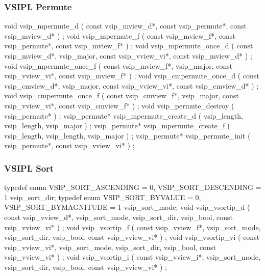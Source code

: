 \subsubsection*{VSIPL Permute}
void vsip_mpermute_d ( const vsip_mview_d*, const vsip_permute*, const vsip_mview_d* ) ;
void vsip_mpermute_f ( const vsip_mview_f*, const vsip_permute*, const vsip_mview_f* ) ;
void vsip_mpermute_once_d ( const vsip_mview_d*, vsip_major, const vsip_vview_vi*, const vsip_mview_d* ) ;
void vsip_mpermute_once_f ( const vsip_mview_f*, vsip_major, const vsip_vview_vi*, const vsip_mview_f* ) ;
void vsip_cmpermute_once_d ( const vsip_cmview_d*, vsip_major, const vsip_vview_vi*, const vsip_cmview_d* ) ;
void vsip_cmpermute_once_f ( const vsip_cmview_f*, vsip_major, const vsip_vview_vi*, const vsip_cmview_f* ) ;
void vsip_permute_destroy ( vsip_permute* ) ;
vsip_permute* vsip_mpermute_create_d ( vsip_length, vsip_length, vsip_major ) ;
vsip_permute* vsip_mpermute_create_f ( vsip_length, vsip_length, vsip_major ) ;
vsip_permute* vsip_permute_init ( vsip_permute*, const vsip_vview_vi* ) ;

\subsubsection*{VSIPL Sort}
typedef enum { VSIP_SORT_ASCENDING = 0, VSIP_SORT_DESCENDING = 1 } vsip_sort_dir;
typedef enum { VSIP_SORT_BYVALUE = 0, VSIP_SORT_BYMAGNITUDE = 1 } vsip_sort_mode;
void vsip_vsortip_d ( const vsip_vview_d*, vsip_sort_mode, vsip_sort_dir, vsip_bool, const vsip_vview_vi* ) ;
void vsip_vsortip_f ( const vsip_vview_f*, vsip_sort_mode, vsip_sort_dir, vsip_bool, const vsip_vview_vi* ) ;
void vsip_vsortip_vi ( const vsip_vview_vi*, vsip_sort_mode, vsip_sort_dir, vsip_bool, const vsip_vview_vi* ) ;
void vsip_vsortip_i ( const vsip_vview_i*, vsip_sort_mode, vsip_sort_dir, vsip_bool, const vsip_vview_vi* ) ;